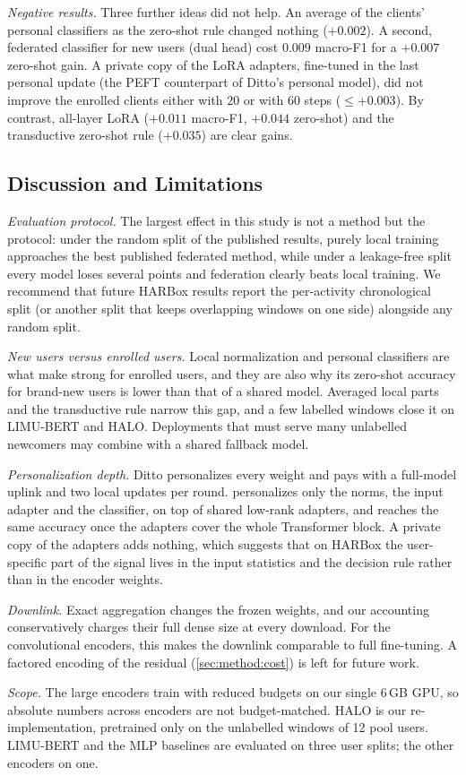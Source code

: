 \emph{Negative results.} Three further ideas did not help. An average of the clients' personal
classifiers as the zero-shot rule changed nothing ($+0.002$). A second, federated classifier for new
users (dual head) cost $0.009$ macro-F1 for a $+0.007$ zero-shot gain. A private copy of the LoRA
adapters, fine-tuned in the last personal update (the PEFT counterpart of Ditto's personal model), did
not improve the enrolled clients either with $20$ or with $60$ steps ($\le+0.003$). By contrast, all-layer
LoRA ($+0.011$ macro-F1, $+0.044$ zero-shot) and the transductive zero-shot rule ($+0.035$) are clear gains.

\subsection{Discussion and Limitations}\label{sec:results:limits}

\emph{Evaluation protocol.} The largest effect in this study is not a method but the protocol:
under the random split of the published results, purely local training approaches the best published
federated method, while under a leakage-free split every model loses several points and federation
clearly beats local training. We recommend that future HARBox results report the per-activity
chronological split (or another split that keeps overlapping windows on one side) alongside any
random split.

\emph{New users versus enrolled users.} Local normalization and personal classifiers are what make
\method{} strong for enrolled users, and they are also why its zero-shot accuracy for brand-new users
is lower than that of a shared model. Averaged local parts and the transductive rule narrow this gap, and
a few labelled windows close it on LIMU-BERT and HALO. Deployments that must serve many
unlabelled newcomers may combine \method{} with a shared fallback model.

\emph{Personalization depth.} Ditto personalizes every weight and pays with a full-model uplink and two
local updates per round. \method{} personalizes only the norms, the input adapter and the classifier,
on top of shared low-rank adapters, and reaches the same accuracy once the adapters cover the whole
Transformer block. A private copy of the adapters adds nothing, which suggests that on HARBox the
user-specific part of the signal lives in the input statistics and the decision rule rather than in the
encoder weights.

\emph{Downlink.} Exact aggregation changes the frozen weights, and our accounting conservatively
charges their full dense size at every download. For the convolutional encoders, this makes the
downlink comparable to full fine-tuning. A factored encoding of the residual (\cref{sec:method:cost}) is
left for future work.

\emph{Scope.} The large encoders train with reduced budgets on our single 6\,GB GPU, so absolute numbers
across encoders are not budget-matched. HALO is our re-implementation, pretrained only on the
unlabelled windows of 12 pool users. LIMU-BERT and the MLP baselines are evaluated on three user splits;
the other encoders on one.
